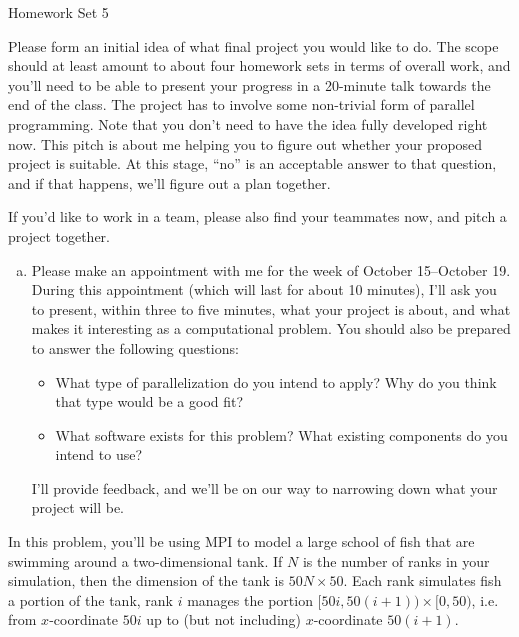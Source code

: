 \documentclass[11pt]{article}
\begin{document}
%
{Homework Set 5}


\bigskip
{}

Please form an initial idea of what final project you would like to
do. The scope should at least amount to about four homework sets in
terms of overall work, and you'll need to be able to present your
progress in a 20-minute talk towards the end of the class. The project
has to involve some non-trivial form of parallel programming. Note
that you don't need to have the idea fully developed right now. This
pitch is about me helping you to figure out whether your proposed
project is suitable. At this stage, ``no'' is an acceptable answer to
that question, and if that happens, we'll figure out a plan together.

If you'd like to work in a team, please also find your teammates now,
and pitch a project together.

\begin{enumerate}[a)]
  \item Please make an appointment with me for the week of
    October 15--October 19. During this appointment (which will last
    for about 10 minutes), I'll ask you to present, within three to
    five minutes, what your project is about, and what makes it
    interesting as a computational problem. You should also be
    prepared to answer the following questions:
    \begin{itemize}
      \item What type of parallelization do you intend to apply? Why
        do you think that type would be a good fit?
      \item What software exists for this problem? What existing
        components do you intend to use?
    \end{itemize}
    I'll provide feedback, and we'll be on our way to narrowing down
    what your project will be.
\end{enumerate}

\bigskip
{}

In this problem, you'll be using MPI to model a large school of fish that are
swimming around a two-dimensional tank. If $N$ is the number of ranks
in your simulation, then the dimension of the tank is $50N \times 50$.
Each rank simulates fish a portion of the tank, rank $i$ manages the
portion $[50i,50(i+1))\times [0,50)$, i.e. from $x$-coordinate $50i$ up to
(but not including) $x$-coordinate $50(i+1)$.
\end{document}
